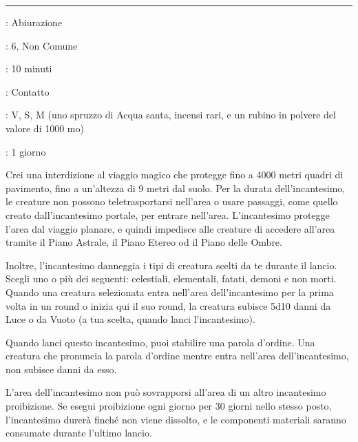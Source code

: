 \begin{multicols}{2}
\smallskip\noindent\rule{\linewidth}{2pt} \hypertarget{Proibizione}{}\medskip{}
\noindent
\begin{description}[noitemsep, topsep=0pt, parsep=0pt, partopsep=0pt, leftmargin=0cm, labelwidth=2.8cm]
	\item[\textbf{Lista di Magia}]: Abiurazione
	\item[\textbf{Livello}]: 6, Non Comune
	\item[\textbf{T. di Lancio}]: 10 minuti
	\item[\textbf{Gittata}]: Contatto
	\item[\textbf{Componenti}]: V, S, M (uno spruzzo di Acqua santa, incensi rari, e un rubino in polvere del valore di 1000 mo)
	\item[\textbf{Durata}]: 1 giorno
\end{description}

Crei una interdizione al viaggio magico che protegge fino a 4000 metri quadri di pavimento, fino a un'altezza di 9 metri dal suolo. Per la durata dell'incantesimo, le creature non possono teletrasportarsi nell'area o usare passaggi, come quello creato dall'incantesimo portale, per entrare nell'area. L'incantesimo protegge l'area dal viaggio planare, e quindi impedisce alle creature di accedere all'area tramite il Piano Astrale, il Piano Etereo od il Piano delle Ombre.

Inoltre, l'incantesimo danneggia i tipi di creatura scelti da te durante il lancio. Scegli uno o più dei seguenti: celestiali, elementali, fatati, demoni e non morti. Quando una creatura selezionata entra nell'area dell'incantesimo per la prima volta in un round o inizia qui il suo round, la creatura subisce 5d10 danni da Luce o da Vuoto (a tua scelta, quando lanci l'incantesimo).

Quando lanci questo incantesimo, puoi stabilire una parola d'ordine. Una creatura che pronuncia la parola d'ordine mentre entra nell'area dell'incantesimo, non subisce danni da esso.

L'area dell'incantesimo non può sovrapporsi all'area di un altro incantesimo proibizione. Se esegui proibizione ogni giorno per 30 giorni nello stesso posto, l'incantesimo durerà finché non viene dissolto, e le componenti materiali saranno consumate durante l'ultimo lancio.


\end{multicols}
